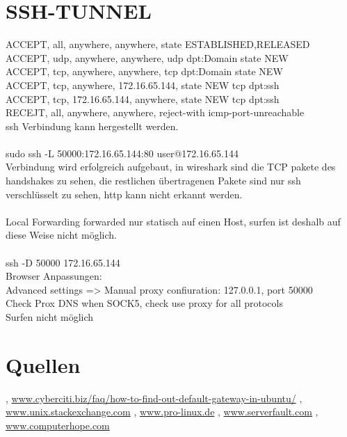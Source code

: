 \documentclass[12pt]{article}
\theoremstyle{plain}
\begin{document}
\section{SSH-TUNNEL}
ACCEPT, all, anywhere, anywhere, state ESTABLISHED,RELEASED\\
ACCEPT, udp, anywhere, anywhere, udp dpt:Domain state NEW\\
ACCEPT, tcp, anywhere, anywhere, tcp dpt:Domain state NEW\\
ACCEPT, tcp, anywhere, 172.16.65.144, state NEW tcp dpt:ssh\\
ACCEPT, tcp, 172.16.65.144, anywhere, state NEW tcp dpt:ssh\\
RECEJT, all, anywhere, anywhere, reject-with icmp-port-unreachable\\
ssh Verbindung kann hergestellt werden.\\
\\
sudo ssh -L 50000:172.16.65.144:80 user@172.16.65.144\\
Verbindung wird erfolgreich aufgebaut, in wireshark sind die TCP pakete des handshakes zu sehen, die restlichen übertragenen Pakete sind nur ssh verschlüsselt zu sehen, http kann nicht erkannt werden.\\
\\
Local Forwarding forwarded nur statisch auf einen Host, surfen ist deshalb auf diese Weise nicht möglich.\\
\\
ssh -D 50000 172.16.65.144\\
Browser Anpassungen:\\
Advanced settings => Manual proxy confiuration: 127.0.0.1, port 50000\\
Check Prox DNS when SOCK5, check use proxy for all protocols\\
Surfen nicht möglich\\
\section{Quellen}
\begin{thebibliography}{50}
\bibitem  [Cyberciti], \url{www.cyberciti.biz/faq/how-to-find-out-default-gateway-in-ubuntu/}
\bibitem [Stackexchange] , \url{www.unix.stackexchange.com}
, \url{www.pro-linux.de}
\bibitem [Serverfault], \url{www.serverfault.com}
\bibitem [computerhope], \url{www.computerhope.com}
\end{thebibliography}
\end{document}

